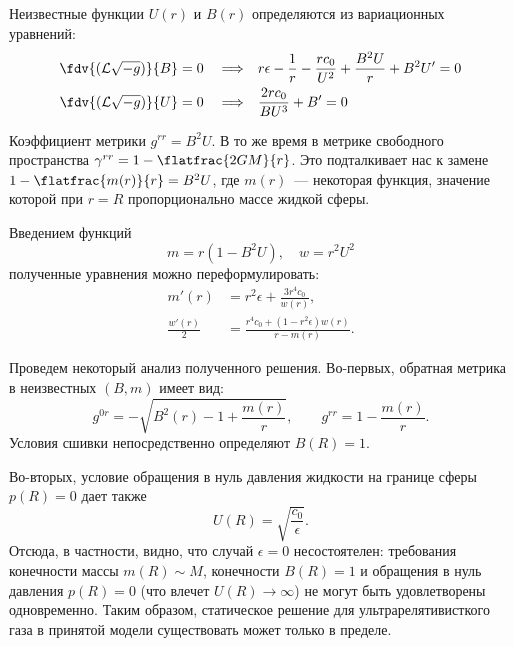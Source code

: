 \documentclass[\docroot/reports/draft/report.tex]{subfiles}
\begin{document}
    Неизвестные функции $U(r)$ и $B(r)$ определяются из вариационных уравнений:
    \begin{align*}
        \fdv{(\mathcal{L}\sqrt{-g})}{B} = 0 \quad\Longrightarrow\quad&
            r \epsilon - \frac{1}{r} - \frac{r c_0}{U^2} + \frac{B^2 U}{r} + B^2 U' = 0 \\
        \fdv{(\mathcal{L}\sqrt{-g})}{U} = 0 \quad\Longrightarrow\quad&
            \frac{2 r c_0}{B U^3} + B' = 0
    \end{align*}

    Коэффициент метрики $g^{rr} = B^2 U$. В то же время в метрике свободного пространства $\gamma^{rr} = 1 - \flatfrac{2 G M}{r}$. Это подталкивает нас к замене $1 - \flatfrac{m(r)}{r} = B^2 U$, где $m(r)$~--- некоторая функция, значение которой при $r = R$ пропорционально массе жидкой сферы.

    Введением функций
    \begin{equation*}
        m = r (1 - B^2 U) , \quad w = r^2 U^2
    \end{equation*}
    полученные уравнения можно переформулировать:
    \begin{align*}
        m'(r) &= r^2 \epsilon + \frac{3 r^4 c_0}{w(r)} , \\
        \frac{w'(r)}{2} &= \frac{r^4 c_0 + (1 - r^2 \epsilon) w(r)}{r - m(r)} .
    \end{align*}

    Проведем некоторый анализ полученного решения. Во-первых, обратная метрика в неизвестных $(B,m)$ имеет вид:
    \begin{equation*}
        g^{0r} = - \sqrt{B^2(r) - 1 + \frac{m(r)}{r}} , \qquad
        g^{rr} = 1 - \frac{m(r)}{r} .
    \end{equation*}
    Условия сшивки непосредственно определяют $B(R) = 1$.

    Во-вторых, условие обращения в нуль давления жидкости на границе сферы $p(R) = 0$ дает также
    \begin{equation*}
        U(R) = \sqrt{\frac{c_0}{\epsilon}} .
    \end{equation*}
    Отсюда, в частности, видно, что случай $\epsilon = 0$ несостоятелен: требования конечности массы $m(R) \sim M$, конечности $B(R) = 1$ и обращения в нуль давления $p(R) = 0$ (что влечет $U(R) \to \infty$) не могут быть удовлетворены одновременно. Таким образом, статическое решение для ультрарелятивисткого газа в принятой модели существовать может только в пределе.
\end{document}
